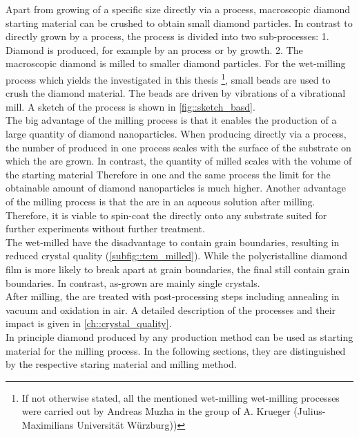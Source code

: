 	Apart from growing \nds of a specific size directly via a \CVD process, macroscopic diamond starting material can be crushed to obtain small diamond particles.
	In contrast to \nds directly grown by a \CVD process, the process is divided into two sub-processes: 
	1. Diamond is produced, for example by an \HPHT process or by \CVD growth.
	2. The macroscopic diamond is milled to smaller diamond particles.
	For the wet-milling process which yields the \nds investigated in this thesis \footnote{If not otherwise stated, all the mentioned wet-milling wet-milling processes were carried out by Andreas Muzha in the group of A. Krueger (Julius-Maximilians Universit\"at W\"urzburg))}, small beads are used to crush the diamond material. 
	The beads are driven by vibrations of a vibrational mill.
	A sketch of the process is shown in \autoref{fig::sketch_basd}.
	\\
	The big advantage of the milling process is that it enables the production of a large quantity of diamond nanoparticles.
	When producing \nds directly via a \CVD process, the number of produced \nds in one process scales with the surface of the substrate on which the \nds are grown.
	In contrast, the quantity of milled \nds scales with the volume of the starting material
	Therefore in one and the same process the limit for the obtainable amount of diamond nanoparticles is much higher.
	Another advantage of the milling process is that the \nds are in an aqueous solution after milling.
	Therefore, it is viable to spin-coat the \nds directly onto any substrate suited for further experiments without further treatment.
	\\
	The wet-milled \nds have the disadvantage to contain grain boundaries, resulting in reduced crystal quality (\autoref{subfig::tem_milled}).
	While the polycristalline diamond film is more likely to break apart at grain boundaries, the final \nds still contain grain boundaries.
	In contrast, as-grown \CVD \nds are mainly single crystals. 
	\\
	After milling, the \nds are treated with post-processing steps including annealing in vacuum and oxidation in air.
	A detailed description of the processes and their impact is given in \ref{ch::crystal_quality}.
	\\
	In principle diamond produced by any production method can be used as starting material for the milling process.
	In the following sections, they are distinguished by the respective staring material and milling method.



